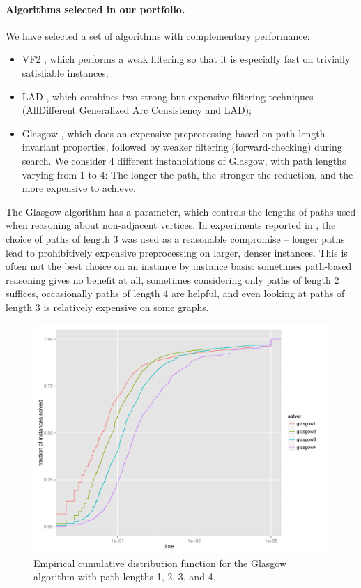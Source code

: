 \documentclass{llncs}
\begin{document}
\paragraph{Algorithms selected in our portfolio.}
We have selected a set of algorithms with complementary performance:
\begin{itemize}
\item VF2 \cite{Cordella:2004}, which performs a weak filtering so that it is especially fast on trivially satisfiable instances;
\item LAD \cite{Solnon:2010}, which combines two strong but expensive filtering techniques (AllDifferent Generalized Arc Consistency and LAD);
\item Glasgow \cite{McCreesh:2015}, which does an expensive preprocessing based on path length invariant properties, followed by weaker filtering (forward-checking) during search. We consider 4 different instanciations of Glasgow, with path lengths varying from 1 to 4: The longer the path, the stronger the reduction, and the more expensive to achieve.
\end{itemize}

The Glasgow algorithm has a parameter, which controls the lengths of paths used
when reasoning about non-adjacent vertices.  In experiments reported in
\cite{McCreesh:2015}, the choice of paths of length 3 was used as a reasonable
compromise -- longer paths lead to prohibitively expensive preprocessing on
larger, denser instances. This is often not the best choice on an instance by
instance basis: sometimes path-based reasoning gives no benefit at all,
sometimes considering only paths of length 2 suffices, occasionally paths of
length 4 are helpful, and even looking at paths of length 3 is relatively
expensive on some graphs.

\begin{figure}[!ht]
\includegraphics[width=\textwidth]{figures/ecdf-glasgow}
\caption{Empirical cumulative distribution function for the Glasgow algorithm
with path lengths 1, 2, 3, and 4.}
\label{fig:ecdf-glasgow}
\end{figure}
\end{document}
